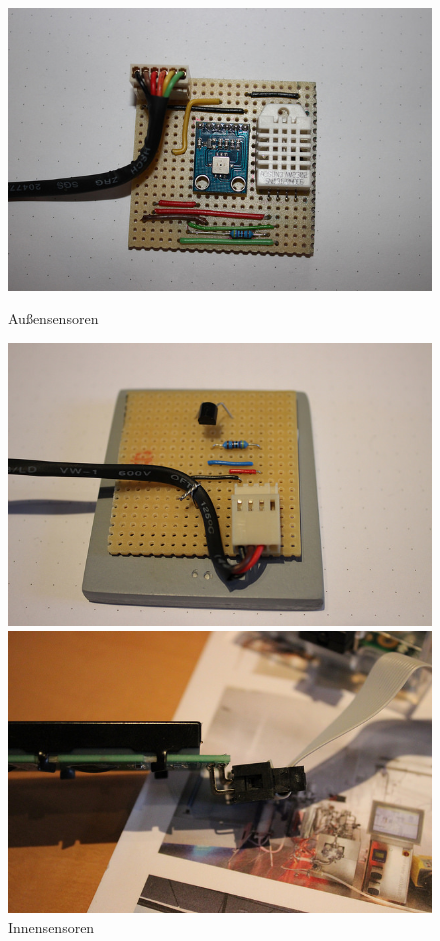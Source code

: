 \begin{figure}[h]
	\begin{minipage}[b]{0.45\textwidth}
		\centering
		\includegraphics[width=\textwidth]{figures/anschluss/2_1.jpg}
		\caption{Außensensoren}
	\end{minipage}\hfill
	\begin{minipage}[b]{0.45\textwidth}
		\centering
		\includegraphics[width=\textwidth]{figures/anschluss/2_2.jpg}
		\caption{Innensensoren}
	\end{minipage}\hfill
	\begin{minipage}[b]{0.45\textwidth}
		\centering
		\includegraphics[width=\textwidth]{figures/anschluss/2_3.jpg}

\end{minipage}
\end{figure}
